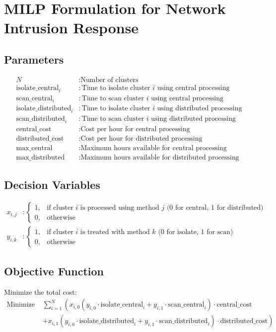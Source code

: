 \documentclass{article}
\begin{document}
\section*{MILP Formulation for Network Intrusion Response}

\subsection*{Parameters}
\begin{align*}
N &: \text{Number of clusters} \\
\text{isolate\_central}_i &: \text{Time to isolate cluster $i$ using central processing} \\
\text{scan\_central}_i &: \text{Time to scan cluster $i$ using central processing} \\
\text{isolate\_distributed}_i &: \text{Time to isolate cluster $i$ using distributed processing} \\
\text{scan\_distributed}_i &: \text{Time to scan cluster $i$ using distributed processing} \\
\text{central\_cost} &: \text{Cost per hour for central processing} \\
\text{distributed\_cost} &: \text{Cost per hour for distributed processing} \\
\text{max\_central} &: \text{Maximum hours available for central processing} \\
\text{max\_distributed} &: \text{Maximum hours available for distributed processing}
\end{align*}

\subsection*{Decision Variables}
\begin{align*}
x_{i,j} &: \begin{cases} 
1, & \text{if cluster $i$ is processed using method $j$ (0 for central, 1 for distributed)} \\
0, & \text{otherwise}
\end{cases} \\
y_{i,k} &: \begin{cases} 
1, & \text{if cluster $i$ is treated with method $k$ (0 for isolate, 1 for scan)} \\
0, & \text{otherwise}
\end{cases}
\end{align*}

\subsection*{Objective Function}
Minimize the total cost:
\begin{align*}
\text{Minimize } & \sum_{i=1}^{N} \left( x_{i,0} (y_{i,0} \cdot \text{isolate\_central}_i + y_{i,1} \cdot \text{scan\_central}_i) \cdot \text{central\_cost} \right. \\
& \left. + x_{i,1} (y_{i,0} \cdot \text{isolate\_distributed}_i + y_{i,1} \cdot \text{scan\_distributed}_i) \cdot \text{distributed\_cost} \right)
\end{align*}
\end{document}

